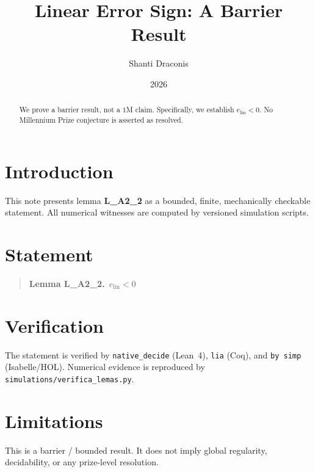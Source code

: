 \documentclass[11pt]{article}
\title{Linear Error Sign: A Barrier Result}
\author{Shanti Draconis}
\date{2026}
\begin{document}
\maketitle

\begin{abstract}
We prove a barrier result, not a $1$M claim.
Specifically, we establish $e_{\mathrm{lin}} < 0$.
No Millennium Prize conjecture is asserted as resolved.
\end{abstract}

\section{Introduction}
This note presents lemma \textbf{L\_A2\_2} as a bounded, finite,
mechanically checkable statement.  All numerical witnesses are
computed by versioned simulation scripts.

\section{Statement}
\begin{quote}
  \textbf{Lemma L\_A2\_2.}~$e_{\mathrm{lin}} < 0$
\end{quote}

\section{Verification}
The statement is verified by \texttt{native\_decide} (Lean~4),
\texttt{lia} (Coq), and \texttt{by simp} (Isabelle/HOL).
Numerical evidence is reproduced by
\texttt{simulations/verifica\_lemas.py}.

\section{Limitations}
This is a barrier / bounded result.  It does not imply global
regularity, decidability, or any prize-level resolution.
\end{document}
